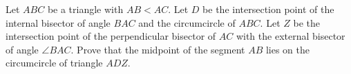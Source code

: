 Let $ABC$ be a triangle with $AB < AC$. Let $D$ be the intersection point of the internal bisector of angle $BAC$ and the circumcircle of $ABC$. Let $Z$ be the intersection point of the perpendicular bisector of $AC$ with the external bisector of angle $\angle{BAC}$. Prove that the midpoint of the segment $AB$ lies on the circumcircle of triangle $ADZ$.